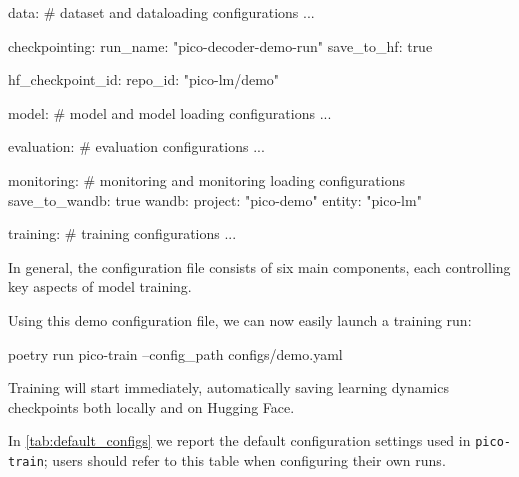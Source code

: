 \begin{center}
    \begin{configlisting}
        data:
            # dataset and dataloading configurations
            ...

        checkpointing:
            run_name: "pico-decoder-demo-run"
            save_to_hf: true

            hf_checkpoint_id:
                repo_id: "pico-lm/demo"
        
        model:
            # model and model loading configurations
            ...

        evaluation:
            # evaluation configurations
            ...

        monitoring:
            # monitoring and monitoring loading configurations
            save_to_wandb: true
            wandb:
                project: "pico-demo"
                entity: "pico-lm"
            
        training:
            # training configurations
            ...
    \end{configlisting}
\end{center}

In general, the configuration file consists of six main components, each controlling key aspects of model training. 

Using this demo configuration file, we can now easily launch a training run:

\begin{center}
    \begin{codelisting}
        poetry run pico-train --config_path configs/demo.yaml
    \end{codelisting}
\end{center}

Training will start immediately, automatically saving learning dynamics checkpoints both locally and on Hugging Face.


In \cref{tab:default_configs} we report the default configuration settings used in \texttt{pico-train}; users should refer to this table when configuring their own runs.


